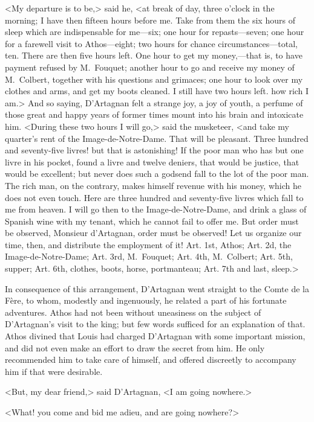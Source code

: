<My departure is to be,> said he, <at break of day, three o'clock in the morning; I have then fifteen hours before me. Take from them the six hours of sleep which are indispensable for me—six; one hour for repasts—seven; one hour for a farewell visit to Athos—eight; two hours for chance circumstances—total, ten. There are then five hours left. One hour to get my money,—that is, to have payment refused by M.~Fouquet; another hour to go and receive my money of M.~Colbert, together with his questions and grimaces; one hour to look over my clothes and arms, and get my boots cleaned. I still have two hours left.  how rich I am.> And so saying, D'Artagnan felt a strange joy, a joy of youth, a perfume of those great and happy years of former times mount into his brain and intoxicate him. <During these two hours I will go,> said the musketeer, <and take my quarter's rent of the Image-de-Notre-Dame. That will be pleasant. Three hundred and seventy-five livres!  but that is astonishing! If the poor man who has but one livre in his pocket, found a livre and twelve deniers, that would be justice, that would be excellent; but never does such a godsend fall to the lot of the poor man. The rich man, on the contrary, makes himself revenue with his money, which he does not even touch. Here are three hundred and seventy-five livres which fall to me from heaven. I will go then to the Image-de-Notre-Dame, and drink a glass of Spanish wine with my tenant, which he cannot fail to offer me. But order must be observed, Monsieur d'Artagnan, order must be observed! Let us organize our time, then, and distribute the employment of it! Art. 1st, Athos; Art. 2d, the Image-de-Notre-Dame; Art. 3rd, M.~Fouquet; Art. 4th, M.~Colbert; Art. 5th, supper; Art. 6th, clothes, boots, horse, portmanteau; Art. 7th and last, sleep.>

In consequence of this arrangement, D'Artagnan went straight to the Comte de la Fère, to whom, modestly and ingenuously, he related a part of his fortunate adventures. Athos had not been without uneasiness on the subject of D'Artagnan's visit to the king; but few words sufficed for an explanation of that. Athos divined that Louis had charged D'Artagnan with some important mission, and did not even make an effort to draw the secret from him. He only recommended him to take care of himself, and offered discreetly to accompany him if that were desirable.

<But, my dear friend,> said D'Artagnan, <I am going nowhere.>

<What! you come and bid me adieu, and are going nowhere?>

